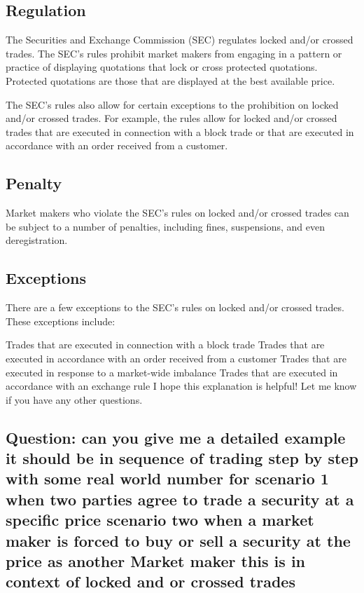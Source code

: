 \documentclass[11pt]{article}
\begin{document}
\subsection{Regulation}
\label{sec:orgb02b33f}

The Securities and Exchange Commission (SEC) regulates locked and/or crossed trades. The SEC's rules prohibit market makers from engaging in a pattern or practice of displaying quotations that lock or cross protected quotations. Protected quotations are those that are displayed at the best available price.

The SEC's rules also allow for certain exceptions to the prohibition on locked and/or crossed trades. For example, the rules allow for locked and/or crossed trades that are executed in connection with a block trade or that are executed in accordance with an order received from a customer.

\subsection{Penalty}
\label{sec:org2878980}

Market makers who violate the SEC's rules on locked and/or crossed trades can be subject to a number of penalties, including fines, suspensions, and even deregistration.

\subsection{Exceptions}
\label{sec:org5e65971}

There are a few exceptions to the SEC's rules on locked and/or crossed trades. These exceptions include:

Trades that are executed in connection with a block trade
Trades that are executed in accordance with an order received from a customer
Trades that are executed in response to a market-wide imbalance
Trades that are executed in accordance with an exchange rule
I hope this explanation is helpful! Let me know if you have any other questions.

\subsection{Question: can you give me a detailed example it should be in sequence of trading step by step with some real world number for scenario 1 when two parties agree to trade a security at a specific price scenario two when a market maker is forced to buy or sell a security at the price as another Market maker this is in context of locked and or crossed trades}
\label{sec:orgf3e6806}
\end{document}

